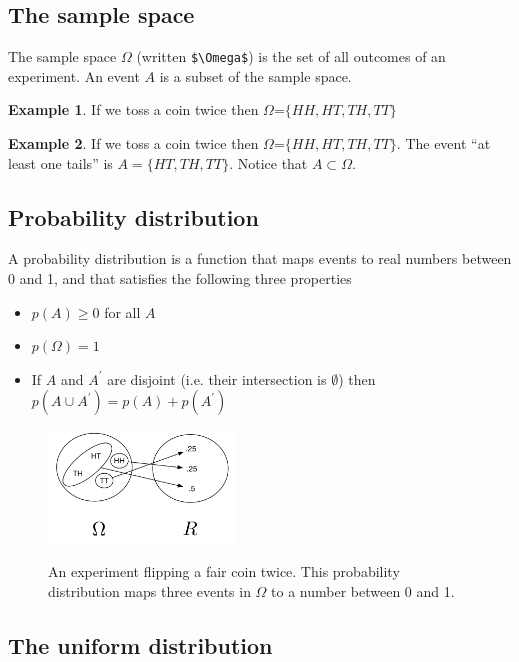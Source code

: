 \documentclass[]{article}
\theoremstyle{definition}
\newtheorem{exmp}{Example}[section]
\begin{document}
\subsection{The sample space}

The sample space $\Omega$  (written \verb|$\Omega$|) is the set of all outcomes of an experiment. An event $A$ is a subset of the sample space. 

\begin{exmp}
If we toss a coin twice then $\Omega$=$\{HH, HT, TH, TT\}$
\end{exmp}

\begin{exmp}
If we toss a coin twice then $\Omega$=$\{HH, HT, TH, TT\}.$ The event ``at least one tails'' is $A=\{HT, TH, TT\}$. Notice that $A \subset \Omega$.
\end{exmp}

\subsection{Probability distribution}

A probability distribution is a function that maps events to real numbers between 0 and 1, and that satisfies the following three properties

\begin{itemize}
\item $p(A) \geq 0$ for all $A$
\item $p(\Omega) = 1$
\item If $A$ and $A^\prime$ are disjoint (i.e. their intersection is $\emptyset$) then $p(A \cup A^{\prime}) =  p(A) + p(A^{\prime})$
\end{itemize}

\begin{figure}[h]
     \centering
    	{\includegraphics[width=5cm]{prob_distro}}
    \caption{An experiment flipping a fair coin twice. This probability distribution maps three events in $\Omega$ to a number between 0 and 1.}
     \label{steady_state}
\end{figure}

\subsection{The uniform distribution}
\end{document}
